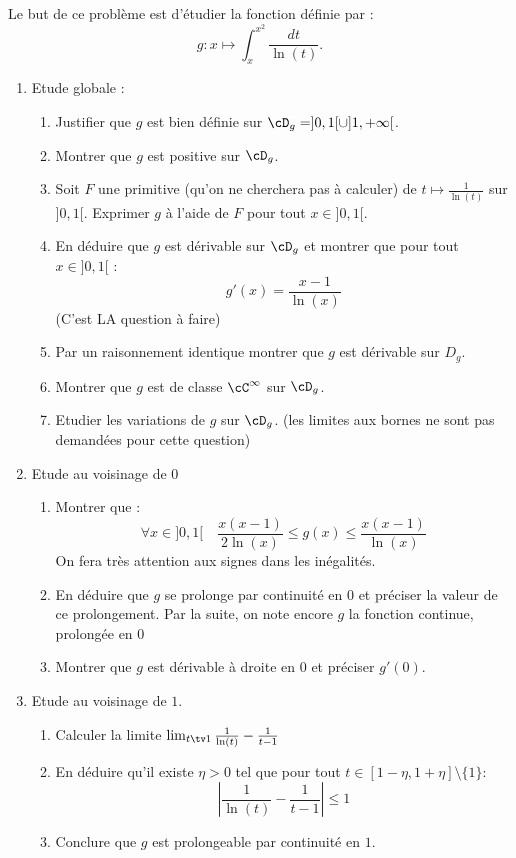 \documentclass[a4paper, 11pt,reqno]{article}
\begin{document}
\begin{probleme}
Le but de ce problème est d'étudier la fonction définie par : 
$$g : x \mapsto \int_x^{x^2} \frac{dt}{\ln(t)}.$$
\begin{enumerate}
\item Etude globale : 
\begin{enumerate}
\item Justifier que $g$ est bien définie sur $\cD_g = ]0,1[\cup ]1,+\infty[$. 
\item Montrer que $g$ est positive sur $\cD_g$. 
\item Soit $F$ une primitive (qu'on ne cherchera pas à calculer) de $t\mapsto \frac{1}{\ln(t)}$ sur $]0,1[$. Exprimer $g$ à l'aide de $F$ pour tout $x\in ]0,1[$.
\item En déduire  que $g$ est dérivable sur $\cD_g$  et montrer que pour tout $x\in ]0,1[$ : 
$$g'(x) =\frac{x-1}{\ln(x)}$$
(C'est LA question à faire)
\item Par un raisonnement identique montrer que $g$ est dérivable sur $D_g$. 
\item Montrer que $g$ est de classe $\cC^\infty$ sur $\cD_g$. 
\item Etudier les variations de $g$ sur $\cD_g$. (les limites aux bornes ne sont pas demandées pour cette question) 
\end{enumerate}
\item Etude au voisinage de $0$
\begin{enumerate}
\item Montrer que :
$$\forall x\in ]0,1[\quad \frac{x(x-1)}{2\ln(x)}\leq g(x)\leq \frac{x(x-1)}{\ln(x)}$$
On fera très attention aux signes dans les inégalités. 
\item En déduire que $g$ se prolonge par continuité en $0$ et préciser la valeur de ce prolongement. 
Par la suite, on note encore $g$ la fonction continue, prolongée en $0$
\item Montrer que $g$ est dérivable à droite en $0$ et préciser $g'(0)$. 
\end{enumerate}
\item Etude au voisinage de $1$.
\begin{enumerate}
\item Calculer la limite  $\lim_{t\tv 1} \frac{1}{\ln(t)} -\frac{1}{t-1}$
\item En déduire qu'il existe $\eta > 0 $ tel que pour tout $t\in [1-\eta, 1+\eta]\setminus \{ 1\} $:
$$ \left|\frac{1}{\ln(t)} -\frac{1}{t-1}\right|\leq 1$$
\item Conclure  que $g$  est prolongeable par continuité en $1$. 
\end{enumerate}


\end{enumerate}

\end{probleme}
\end{document}
